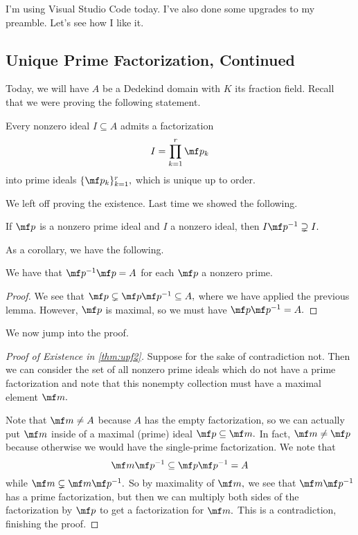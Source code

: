 \documentclass[../notes.tex]{subfiles}
\begin{document}












I'm using Visual Studio Code today. I've also done some upgrades to my preamble. Let's see how I like it.

\subsection{Unique Prime Factorization, Continued}
Today, we will have $A$ be a Dedekind domain with $K$ its fraction field. Recall that we were proving the following statement.
\begin{thm} \label{thm:upf2}
    Every nonzero ideal $I\subseteq A$ admits a factorization
    \[I=\prod_{k=1}^r\mf p_k\]
    into prime ideals $\{\mf p_k\}_{k=1}^r,$ which is unique up to order.
\end{thm}
We left off proving the existence. Last time we showed the following.
\begin{lem}
    If $\mf p$ is a nonzero prime ideal and $I$ a nonzero ideal, then $I\mf p^{-1}\supsetneq I.$
\end{lem}
As a corollary, we have the following.
\begin{cor}
    We have that $\mf p^{-1}\mf p=A$ for each $\mf p$ a nonzero prime.
\end{cor}
\begin{proof}
    We see that $\mf p\subsetneq\mf p\mf p^{-1}\subseteq A,$ where we have applied the previous lemma. However, $\mf p$ is maximal, so we must have $\mf p\mf p^{-1}=A.$
\end{proof}
We now jump into the proof.
\begin{proof}[Proof of Existence in \autoref{thm:upf2}]
    Suppose for the sake of contradiction not. Then we can consider the set of all nonzero prime ideals which do not have a prime factorization and note that this nonempty collection must have a maximal element $\mf m.$

    Note that $\mf m\ne A$ because $A$ has the empty factorization, so we can actually put $\mf m$ inside of a maximal (prime) ideal $\mf p\subseteq\mf m.$ In fact, $\mf m\ne\mf p$ because otherwise we would have the single-prime factorization. We note that
    \[\mf m\mf p^{-1}\subseteq\mf p\mf p^{-1}=A\]
    while $\mf m\subsetneq \mf m\mf p^{-1}.$ So by maximality of $\mf m,$ we see that $\mf m\mf p^{-1}$ has a prime factorization, but then we can multiply both sides of the factorization by $\mf p$ to get a factorization for $\mf m.$ This is a contradiction, finishing the proof.
\end{proof}
\end{document}
